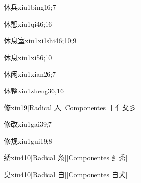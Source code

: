 \begin{verbete}{休兵}{xiu1bing1}{6;7}
\end{verbete}

\begin{verbete}{休憩}{xiu1qi4}{6;16}
\end{verbete}

\begin{verbete}{休息室}{xiu1xi1shi4}{6;10;9}
\end{verbete}

\begin{verbete}{休息}{xiu1xi5}{6;10}
\end{verbete}

\begin{verbete}{休闲}{xiu1xian2}{6;7}
\end{verbete}

\begin{verbete}{休整}{xiu1zheng3}{6;16}
\end{verbete}

\begin{verbete}{修}{xiu1}{9}[Radical 人][Componentes 丨亻夂彡]
\end{verbete}

\begin{verbete}{修改}{xiu1gai3}{9;7}
\end{verbete}

\begin{verbete}{修规}{xiu1gui1}{9;8}
\end{verbete}

\begin{verbete}{绣}{xiu4}{10}[Radical 糸][Componentes 纟秀]
\end{verbete}

\begin{verbete}{臭}{xiu4}{10}[Radical ⾃][Componentes ⾃犬]
\end{verbete}

